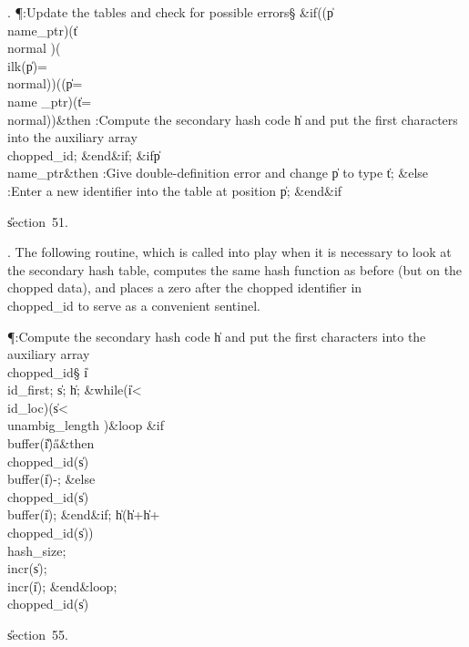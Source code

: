. \P\?:Update the tables and check for possible errors\X\S\?\6
\&{if}\1\1\?\8\1(\1(\?\|p\?\I\?\\{name\_ptr}\?\2)\W\1(\?\|t\?\I\?\\{normal}\?%
\2)\W\1(\?\\{ilk}\?\1(\?\|p\?\2)=\?\\{normal}\?\2)\2)\V\1(\1(\?\|p\?=\?\\{name%
\_ptr}\?\2)\W\1(\?\|t\?=\?\\{normal}\?\2)\2)\?\2\8\&{then}\6
:Compute the secondary hash code \|h and put the first characters into the
auxiliary array \\{chopped\_id}\X;\2\6
\&{end}\8\2\&{if}\1;\6
\&{if}\1\1\8\|p\?\I\?\\{name\_ptr}\2\8\&{then}\6
:Give double-definition error and change \|p to type \|t\X;\6
\4\&{else}\6
:Enter a new identifier into the table at position \|p\X;\2\6
\&{end}\8\2\&{if}\1\par
\U section~51.\fi

. The following routine, which is called into play when it is necessary to
look at the secondary hash table, computes the same hash function as before
(but on the chopped data), and places a zero after the chopped identifier
in \\{chopped\_id} to serve as a convenient sentinel.

\Y\P\?\4:Compute the secondary hash code \|h and put the first characters
into the auxiliary array \\{chopped\_id}\X\S\?\6
\|i\?\K\?\\{id\_first};\5
\|s\?\K{};\5
\|h\?\K{};\6
\1\&{while}\?\8\1(\?\|i\?<\?\\{id\_loc}\?\2)\W\1(\?\|s\?<\?\\{unambig\_length}%
\?\2)\?\8\&{loop}\6
\&{if}\1\1\8\\{buffer}\?\1(\?\|i\?\2)\G\?\H{a}\2\8\&{then}\6
\\{chopped\_id}\?\1(\?\|s\?\2)\K\?\\{buffer}\?\1(\?\|i\?\2)-\?;\6
\4\&{else}\6
\\{chopped\_id}\?\1(\?\|s\?\2)\K\?\\{buffer}\?\1(\?\|i\?\2)\?;\2\6
\&{end}\8\2\&{if}\1;\6
\|h\?\K\1(\?\|h\?+\?\|h\?+\?\\{chopped\_id}\?\1(\?\|s\?\2)\2)%
\?\\{hash\_size};\5
\\{incr}\?\1(\?\|s\?\2)\?;\5
\\{incr}\?\1(\?\|i\?\2)\?;\2\6
\&{end}\8\&{loop};\6
\\{chopped\_id}\?\1(\?\|s\?\2)\K{}\par
\U section~55.\fi

